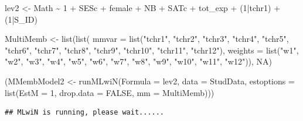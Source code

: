 \documentclass[
]{book}
\newenvironment{Shaded}{\begin{snugshade}}{\end{snugshade}}
\newcommand{\AttributeTok}[1]{\textcolor[rgb]{0.77,0.63,0.00}{#1}}
\newcommand{\ConstantTok}[1]{\textcolor[rgb]{0.00,0.00,0.00}{#1}}
\newcommand{\DecValTok}[1]{\textcolor[rgb]{0.00,0.00,0.81}{#1}}
\newcommand{\FunctionTok}[1]{\textcolor[rgb]{0.00,0.00,0.00}{#1}}
\newcommand{\NormalTok}[1]{#1}
\newcommand{\OtherTok}[1]{\textcolor[rgb]{0.56,0.35,0.01}{#1}}
\newcommand{\SpecialCharTok}[1]{\textcolor[rgb]{0.00,0.00,0.00}{#1}}
\newcommand{\StringTok}[1]{\textcolor[rgb]{0.31,0.60,0.02}{#1}}
\begin{document}
\begin{Shaded}
\begin{Highlighting}[]
\NormalTok{lev2 }\OtherTok{\textless{}{-}}\NormalTok{ Math }\SpecialCharTok{\textasciitilde{}} \DecValTok{1} \SpecialCharTok{+}\NormalTok{ SESc }\SpecialCharTok{+}\NormalTok{ female }\SpecialCharTok{+}\NormalTok{ NB }\SpecialCharTok{+}\NormalTok{ SATc }\SpecialCharTok{+}\NormalTok{ tot\_exp }\SpecialCharTok{+}\NormalTok{ (}\DecValTok{1}\SpecialCharTok{|}\NormalTok{tchr1) }\SpecialCharTok{+}\NormalTok{ (}\DecValTok{1}\SpecialCharTok{|}\NormalTok{S\_ID)}

\NormalTok{MultiMemb }\OtherTok{\textless{}{-}} \FunctionTok{list}\NormalTok{(}\FunctionTok{list}\NormalTok{(}
  \AttributeTok{mmvar =} \FunctionTok{list}\NormalTok{(}\StringTok{"tchr1"}\NormalTok{, }\StringTok{"tchr2"}\NormalTok{, }\StringTok{"tchr3"}\NormalTok{, }\StringTok{"tchr4"}\NormalTok{, }\StringTok{"tchr5"}\NormalTok{, }\StringTok{"tchr6"}\NormalTok{, }\StringTok{"tchr7"}\NormalTok{, }\StringTok{"tchr8"}\NormalTok{, }\StringTok{"tchr9"}\NormalTok{, }\StringTok{"tchr10"}\NormalTok{, }\StringTok{"tchr11"}\NormalTok{, }\StringTok{"tchr12"}\NormalTok{),}
  \AttributeTok{weights =} \FunctionTok{list}\NormalTok{(}\StringTok{"w1"}\NormalTok{, }\StringTok{"w2"}\NormalTok{, }\StringTok{"w3"}\NormalTok{, }\StringTok{"w4"}\NormalTok{, }\StringTok{"w5"}\NormalTok{, }\StringTok{"w6"}\NormalTok{, }\StringTok{"w7"}\NormalTok{, }\StringTok{"w8"}\NormalTok{, }\StringTok{"w9"}\NormalTok{, }\StringTok{"w10"}\NormalTok{, }\StringTok{"w11"}\NormalTok{, }\StringTok{"w12"}\NormalTok{)), }\ConstantTok{NA}\NormalTok{)}

\NormalTok{(MMembModel2 }\OtherTok{\textless{}{-}} \FunctionTok{runMLwiN}\NormalTok{(}\AttributeTok{Formula =}\NormalTok{ lev2, }\AttributeTok{data =}\NormalTok{ StudData, }\AttributeTok{estoptions =} \FunctionTok{list}\NormalTok{(}\AttributeTok{EstM =} \DecValTok{1}\NormalTok{, }\AttributeTok{drop.data =} \ConstantTok{FALSE}\NormalTok{, }\AttributeTok{mm =}\NormalTok{ MultiMemb)))}
\end{Highlighting}
\end{Shaded}

\begin{verbatim}
## MLwiN is running, please wait......
\end{verbatim}
\end{document}
